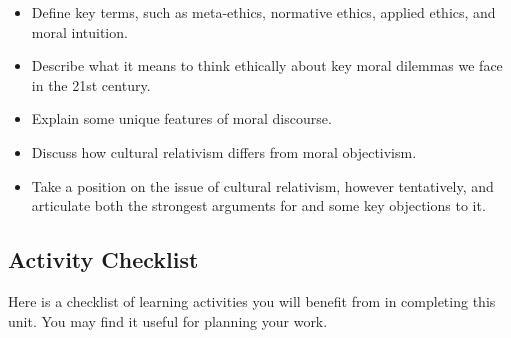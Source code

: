 \documentclass[
]{book}
\providecommand{\tightlist}{%
  \setlength{\itemsep}{0pt}\setlength{\parskip}{0pt}}
\begin{document}
\begin{itemize}
\tightlist
\item
  Define key terms, such as meta-ethics, normative ethics, applied ethics, and moral intuition.\\
\item
  Describe what it means to think ethically about key moral dilemmas we face in the 21st century.\\
\item
  Explain some unique features of moral discourse.\\
\item
  Discuss how cultural relativism differs from moral objectivism.\\
\item
  Take a position on the issue of cultural relativism, however tentatively, and articulate both the strongest arguments for and some key objections to it.
\end{itemize}

\hypertarget{activity-checklist}{%
\subsection*{Activity Checklist}\label{activity-checklist}}

Here is a checklist of learning activities you will benefit from in completing this unit. You may find it useful for planning your work.
\end{document}
